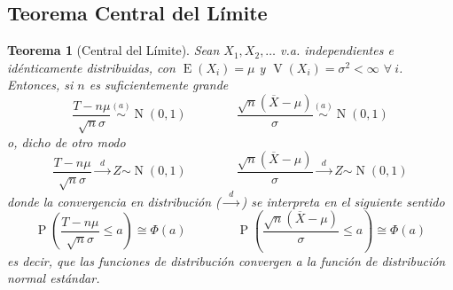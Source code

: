 \documentclass[11pt]{article}
\theoremstyle{plain}
\newtheorem*{teo}{Teorema}
\theoremstyle{definition}
\theoremstyle{remark}
\newcommand{\proba}{\ensuremath{\operatorname{P}}}  %
\newcommand{\esp}[0]{\ensuremath{\operatorname{E}}}  %
\newcommand{\var}[0]{\ensuremath{\operatorname{V}}}  %
\newcommand{\foralle}{\ensuremath{\forall \ }}  %
\newcommand{\dist}[1]{\ensuremath{\sim \operatorname{#1}}}  %
\newcommand{\distt}[2]{\ensuremath{\overset{#1}{\sim} \operatorname{#2}}}  %
\newcommand{\tiende}[1]{\ensuremath{\xrightarrow{\;\; #1 \;\;}}}  %
\begin{document}
  \subsection{Teorema Central del Límite}

    \begin{teo}[Central del Límite]
      Sean $X_1,X_2,\dots$ v.a. independientes e idénticamente distribuidas, con $\esp(X_i) = \mu$ y $\var(X_i) = \sigma^2 < \infty$ $\foralle i$. Entonces, si $n$ es suficientemente grande
      \[ \frac{T - n\mu}{\sqrt{n} \sigma} \distt{(a)}{N}(0,1) \qquad \qquad \frac{\sqrt{n} (\overline{X} - \mu)}{\sigma} \distt{(a)}{N}(0,1) \]
      o, dicho de otro modo
      \[ \frac{T - n\mu}{\sqrt{n} \sigma} \tiende{d} Z\dist{N}(0,1) \qquad \qquad \frac{\sqrt{n} (\overline{X} - \mu)}{\sigma} \tiende{d} Z\dist{N}(0,1) \]
      donde la convergencia en distribución ($\tiende{d}$) se interpreta en el siguiente sentido
      \[ \proba\left( \frac{T - n\mu}{\sqrt{n} \sigma} \leq a \right) \cong \Phi(a) \qquad \qquad \proba\left( \frac{\sqrt{n} (\overline{X} - \mu)}{\sigma} \leq a \right) \cong \Phi(a) \]
      es decir, que las funciones de distribución convergen a la función de distribución normal estándar.
    \end{teo}
\end{document}
